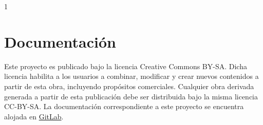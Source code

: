 1\chapter{Documentación}\label{cap:documentación}
	
		Este proyecto es publicado bajo la licencia  Creative Commons BY-SA. Dicha licencia habilita a los usuarios a combinar, modificar y crear nuevos contenidos a partir de esta obra, incluyendo propósitos comerciales. Cualquier obra derivada generada a partir de esta publicación debe ser distribuida bajo la misma licencia CC-BY-SA. La documentación correspondiente a este proyecto se encuentra alojada en \href{https://gitlab.com/emablanco/trabajo-final-tusl}{\color{blue}GitLab}.\par